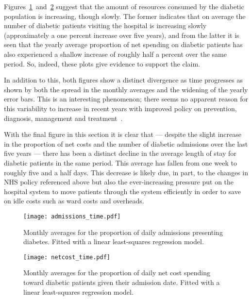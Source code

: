 Figures~\ref{fig:admissions}~and~\ref{fig:netcost_proportions} suggest that the
amount of resources consumed by the diabetic population is increasing, though
slowly. The former indicates that on average the number of diabetic patients
visiting the hospital is increasing slowly (approximately a one percent increase
over five years), and from the latter it is seen that the yearly average
proportion of net spending on diabetic patients has also experienced a shallow
increase of roughly half a percent over the same period. So, indeed, these plots
give evidence to support the claim.

In addition to this, both figures show a distinct divergence as time progresses
as shown by both the spread in the monthly averages and the widening of the
yearly error bars. This is an interesting phenomenon; there seems no apparent
reason for this variability to increase in recent years with improved policy on
prevention, diagnosis, management and
treatment~\cite{NHS:ltp,NICE,Penn2018,PHE}.

With the final figure in this section it is clear that --- despite the slight
increase in the proportion of net costs and the number of diabetic admissions
over the last five years --- there has been a distinct decline in the average
length of stay for diabetic patients in the same period. This average has fallen
from one week to roughly five and a half days. This decrease is likely due, in
part, to the changes in NHS policy referenced above but also the ever-increasing
pressure put on the hospital system to move patients through the system
efficiently in order to save on idle costs such as ward costs and overheads.

\begin{figure}[htbp]
    \centering
    \texttt{[image: admissions\_time.pdf]}
    \caption{Monthly averages for the proportion of daily admissions presenting
        diabetes. Fitted with a linear least-squares regression model.}%
    \label{fig:admissions}
\end{figure}

\begin{figure}[htbp]
    \centering
    \texttt{[image: netcost\_time.pdf]}
    \caption{Monthly averages for the proportion of daily net cost spending
        toward diabetic patients given their admission date. Fitted with a
        linear least-squares regression model.}%
    \label{fig:netcost_proportions}
\end{figure}

